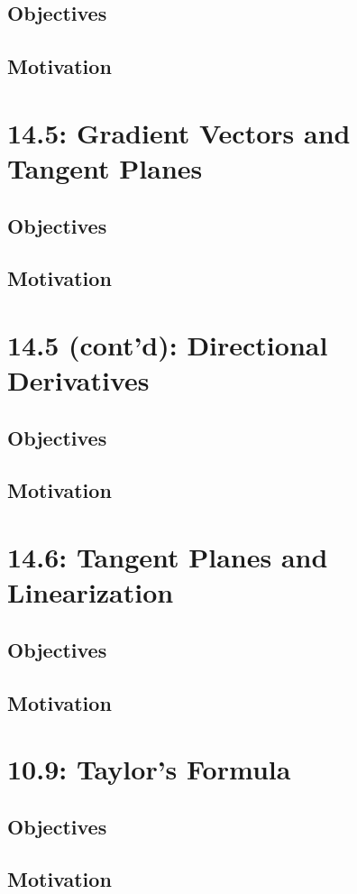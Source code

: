 \documentclass{report}
\begin{document}
\begin{sloppypar}
\section{Objectives}
\section{Motivation}
\chapter{14.5: Gradient Vectors and Tangent Planes}
\section{Objectives}
\section{Motivation}
\chapter{14.5 (cont'd): Directional Derivatives}
\section{Objectives}
\section{Motivation}
\chapter{14.6: Tangent Planes and Linearization}
\section{Objectives}
\section{Motivation}
\chapter{10.9: Taylor's Formula}
\section{Objectives}
\section{Motivation}

\end{sloppypar}
\end{document}
